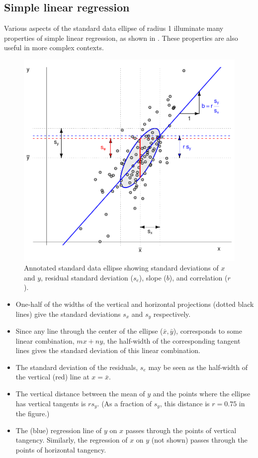\subsection{Simple linear regression}

Various aspects of the standard data ellipse of radius 1 illuminate many properties
of simple linear regression, as shown in .
These properties are also useful in more complex contexts.

\begin{figure}[htb]
  \centering
  \includegraphics[width=.6\textwidth,clip]{fig/ellipses-demo}
  \caption{Annotated standard data ellipse showing standard deviations of $x$ and $y$, residual
  standard deviation ($s_e$), slope ($b$), and correlation ($r$).
  }%
  \label{fig:ellipses-demo}
\end{figure}

\begin{itemize}
  \item One-half of the widths of the vertical and horizontal projections (dotted black lines)
  give the standard deviations $s_x$ and $s_y$ respectively.
  \item Since any line through the center of the ellipse ($\bar{x}, \bar{y}$), corresponds to
  some linear combination, $m x + n y$, the half-width of the corresponding tangent lines
  gives the standard deviation of this linear combination.
  \item The standard deviation of the residuals, $s_e$ may be seen as the half-width of the vertical
  (red) line at $x=\bar{x}$.
  \item The vertical distance between the mean of $y$ and the points where the ellipse has vertical
  tangents is $r s_y$. (As a fraction of $s_y$, this distance is $r = 0.75$ in the figure.)
  \item The (blue) regression line of $y$ on $x$ passes through the points of vertical tangency.
  Similarly, the regression of $x$ on $y$ (not shown) passes through the points of
  horizontal tangency.
  
\end{itemize}


